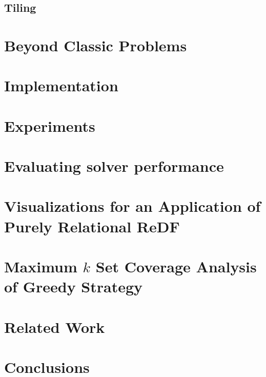 \subsection{Tiling}
\label{subsection:tiling}

\section{Beyond Classic Problems}
\label{subsection:beoynd}


\section{Implementation}
\label{section:implementation}


\section{Experiments}
\label{section:experiments}


\section{Evaluating solver performance}  \label{subsec:evaluatingsolver}


\section{Visualizations for an Application of Purely Relational ReDF}\label{appendix:application_purel_relational}

\section{Maximum $k$ Set Coverage Analysis of Greedy Strategy}\label{appendix:k_set_coverage_analysis}


\section{Related Work}
\label{section:related_work}

\section{Conclusions}
\label{section:discussion}


\cleardoublepage

